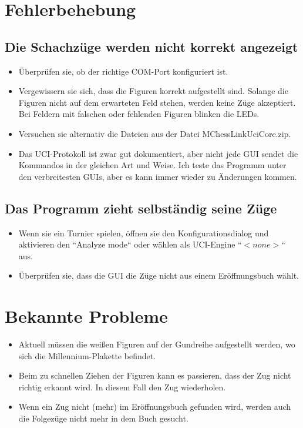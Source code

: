 \documentclass[11pt,a4paper]{article}
\begin{document}
\section{Fehlerbehebung}


\subsection{Die Schachzüge werden nicht korrekt angezeigt}
\begin{itemize}
	\item Überprüfen sie, ob der richtige COM-Port konfiguriert ist.
	\item Vergewissern sie sich, dass die Figuren korrekt aufgestellt sind. Solange die Figuren nicht auf dem erwarteten Feld stehen, werden keine Züge akzeptiert. Bei Feldern mit falschen oder fehlenden Figuren blinken die LEDs.
	\item Versuchen sie alternativ die Dateien aus der Datei MChessLinkUciCore.zip.
	\item Das UCI-Protokoll ist zwar gut dokumentiert, aber nicht jede GUI sendet die Kommandos in der gleichen Art und Weise. Ich teste das Programm unter den verbreitesten GUIs, aber es kann immer wieder zu Änderungen kommen.
\end{itemize}

\subsection{Das Programm zieht selbständig seine Züge}
\begin{itemize}
\item Wenn sie ein Turnier spielen, öffnen sie den Konfigurationsdialog und aktivieren den ``Analyze mode`` oder wählen als UCI-Engine ``\begin{math}<none>\end{math}`` aus.
\item Überprüfen sie, dass die GUI die Züge nicht aus einem Eröffnungsbuch wählt.
\end{itemize}

\section{Bekannte Probleme}
\begin{itemize}
	\item Aktuell müssen die weißen Figuren auf der Gundreihe aufgestellt werden, wo sich die Millennium-Plakette befindet. 
    \item Beim zu schnellen Ziehen der Figuren kann es passieren, dass der Zug nicht richtig erkannt wird. In diesem Fall den Zug wiederholen.
	\item Wenn ein Zug nicht (mehr) im Eröffnungsbuch gefunden wird, werden auch die Folgezüge nicht mehr in dem Buch gesucht.
\end{itemize}
\end{document}

